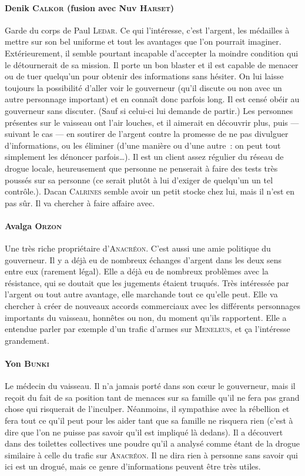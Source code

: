 {\paragraph{Denik \textsc{Calkor} (fusion avec Nuv \textsc{Harset})}
{
Garde du corps de Paul \textsc{Ledar}.
Ce qui l’intéresse, c’est l’argent, les médailles à mettre sur son bel uniforme et tout les avantages que l’on pourrait imaginer.
Extérieurement, il semble pourtant incapable d’accepter la moindre condition qui le détournerait de sa mission.
Il porte un bon blaster et il est capable de menacer ou de tuer quelqu’un pour obtenir des informations sans hésiter.
On lui laisse toujours la possibilité d’aller voir le gouverneur (qu’il discute ou non avec un autre personnage important) et en connaît donc parfois long.
Il est censé obéir au gouverneur sans discuter. (Sauf si celui-ci lui demande de partir.)
Les personnes présentes sur le vaisseau ont l’air louches, et il aimerait en découvrir plus, puis — suivant le cas — en soutirer de l’argent contre la promesse de ne pas divulguer d’informations, ou les éliminer (d’une manière ou d’une autre~: on peut tout simplement les dénoncer parfois\ldots).
Il est un client assez régulier du réseau de drogue locale, heureusement que personne ne penserait à faire des tests très poussés sur sa personne (ce serait plutôt à lui d’exiger de quelqu’un un tel contrôle.).
Dacan \textsc{Calrines} semble avoir un petit stocke chez lui, mais il n’est en pas sûr.
Il va chercher à faire affaire avec.
}

\paragraph{Avalga \textsc{Orzon}}
{
Une très riche propriétaire d’\textsc{Anacréon}.
C’est aussi une amie politique du gouverneur.
Il y a déjà eu de nombreux échanges d’argent dans les deux sens entre eux (rarement légal).
Elle a déjà eu de nombreux problèmes avec la résistance, qui se doutait que les jugements étaient truqués.
Très intéressée par l’argent ou tout autre avantage, elle marchande tout ce qu’elle peut.
Elle va chercher à créer de nouveaux accords commerciaux avec les différents personnages importants du vaisseau, honnêtes ou non, du moment qu’ils rapportent.
Elle a entendue parler par exemple d’un trafic d’armes sur \textsc{Meneleus}, et ça l’intéresse grandement.
}

\paragraph{Yon \textsc{Bunki}}
{
Le médecin du vaisseau.
Il n’a jamais porté dans son cœur le gouverneur, mais il reçoit du fait de sa position tant de menaces sur sa famille qu’il ne fera pas grand chose qui risquerait de l’inculper.
Néanmoins, il sympathise avec la rébellion et fera tout ce qu’il peut pour les aider tant que sa famille ne risquera rien (c’est à dire que l’on ne puisse pas savoir qu’il est impliqué là dedans).
Il a découvert dans des toilettes collectives une poudre qu’il a analysé comme étant de la drogue similaire à celle du trafic sur \textsc{Anacréon}.
Il ne dira rien à personne sans savoir qui ici est un drogué, mais ce genre d’informations peuvent être très utiles.
}

}
